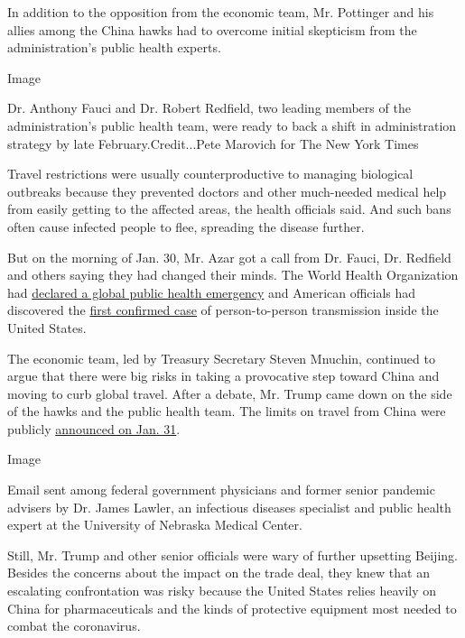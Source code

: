 In addition to the opposition from the economic team, Mr. Pottinger and
his allies among the China hawks had to overcome initial skepticism from
the administration's public health experts.

Image

Dr. Anthony Fauci and Dr. Robert Redfield, two leading members of the
administration's public health team, were ready to back a shift in
administration strategy by late February.Credit...Pete Marovich for The
New York Times

Travel restrictions were usually counterproductive to managing
biological outbreaks because they prevented doctors and other
much-needed medical help from easily getting to the affected areas, the
health officials said. And such bans often cause infected people to
flee, spreading the disease further.

But on the morning of Jan. 30, Mr. Azar got a call from Dr. Fauci, Dr.
Redfield and others saying they had changed their minds. The World
Health Organization had
\href{https://www.who.int/news-room/detail/30-01-2020-statement-on-the-second-meeting-of-the-international-health-regulations-(2005)-emergency-committee-regarding-the-outbreak-of-novel-coronavirus-(2019-ncov)}{declared
a global public health emergency} and American officials had discovered
the
\href{https://www.cdc.gov/media/releases/2020/p0130-coronavirus-spread.html}{first
confirmed case} of person-to-person transmission inside the United
States.

The economic team, led by Treasury Secretary Steven Mnuchin, continued
to argue that there were big risks in taking a provocative step toward
China and moving to curb global travel. After a debate, Mr. Trump came
down on the side of the hawks and the public health team. The limits on
travel from China were publicly
\href{https://www.whitehouse.gov/presidential-actions/proclamation-suspension-entry-immigrants-nonimmigrants-persons-pose-risk-transmitting-2019-novel-coronavirus/}{announced
on Jan. 31}.

Image

Email sent among federal government physicians and former senior
pandemic advisers by Dr. James Lawler, an infectious diseases specialist
and public health expert at the University of Nebraska Medical Center.

Still, Mr. Trump and other senior officials were wary of further
upsetting Beijing. Besides the concerns about the impact on the trade
deal, they knew that an escalating confrontation was risky because the
United States relies heavily on China for pharmaceuticals and the kinds
of protective equipment most needed to combat the coronavirus.

